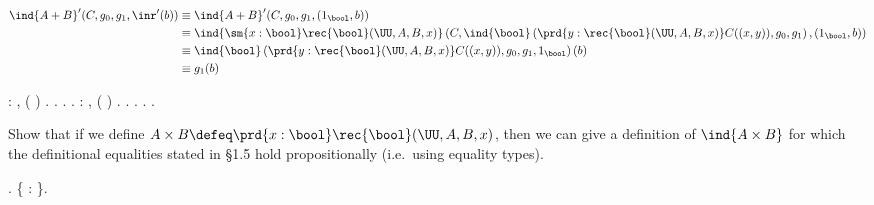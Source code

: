     \begin{align*}
    \ind{A+B}'(C, g_{0}, g_{1}, \inr'(b)) 
    &\equiv
    \ind{A+B}'(C, g_{0}, g_{1}, (1_{\bool}, b)) 
    \\&\equiv
    \ind{\sm{x:\bool}\rec{\bool}(\UU, A, B, x)}\left(
    C,
    \ind{\bool}\left(
    \prd{y:\rec{\bool}(\UU, A, B, x)} C((x, y)),
    g_{0},
    g_{1}
    \right),
    (1_{\bool}, b)
    \right)
    \\&\equiv
    \ind{\bool}\left(
    \prd{y:\rec{\bool}(\UU, A, B, x)} C((x, y)),
    g_{0},
    g_{1},
    1_{\bool}
    \right)(b)
    \\&\equiv
    g_{1}(b)
    \end{align*} \begin{coqdoccode}
\coqdocemptyline
\coqdocindent{1.00em}
  : \coqdoceol
\coqdocindent{2.00em}
\coqdockw{\ensuremath{\forall}}    ,     ( ) \coqdocnotation{=}  .\coqdoceol
\coqdocindent{1.00em}
.\coqdoceol
\coqdocindent{2.00em}
.\coqdoceol
\coqdocindent{1.00em}
.\coqdoceol
\coqdocemptyline
\coqdocindent{1.00em}
  : \coqdoceol
\coqdocindent{2.00em}
\coqdockw{\ensuremath{\forall}}    ,     ( ) \coqdocnotation{=}  .\coqdoceol
\coqdocindent{1.00em}
.\coqdoceol
\coqdocindent{2.00em}
.\coqdoceol
\coqdocindent{1.00em}
.\coqdoceol
\coqdocemptyline
\coqdocnoindent
{} .\coqdoceol
\coqdocemptyline
\end{coqdoccode}
Show that if we define $A \times B \defeq \prd{x : \bool}
    \rec{\bool}(\UU, A, B, x)$, then we can give a definition of $\ind{A \times
    B}$ for which the definitional equalities stated in \S1.5 hold
    propositionally (i.e.~using equality types). \begin{coqdoccode}
\coqdocemptyline
\coqdocnoindent
{} .\coqdoceol
\coqdocindent{1.00em}
 \{  : \}.\coqdoceol
\coqdocemptyline
\end{coqdoccode}

